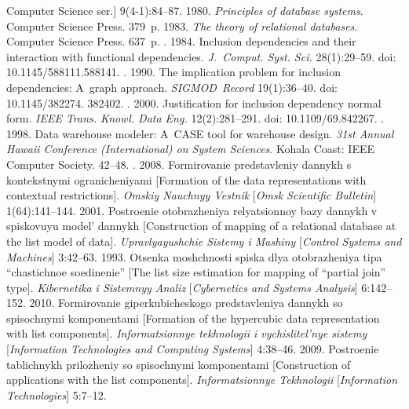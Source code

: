 \begin{multicols}{2}
{{\begin{thebibliography}{99}
{Computer Science ser.}] 9(4-1):84--87.
 1980. \textit{Principles of database systems}. Computer Science Press. 379~p.
 1983. \textit{The theory of relational databases}. Computer Science Press. 637~p.
. 1984. 
Inclusion dependencies and their interaction with functional dependencies. 
\textit{J.~Comput. Syst. Sci.} 28(1):29--59. doi: 10.1145/588111.588141.
. 1990. 
The implication problem for inclusion dependencies: A~graph approach. 
\mbox{\textit{SIGMOD Record}} 19(1):36--40. doi: 10.1145/382274. 382402.
. 2000. 
Justification for inclusion dependency normal form. 
\textit{IEEE Trans. Knowl. Data Eng.} 12(2):281--291. 
doi: 10.1109/69.842267.
. 1998. Data warehouse modeler: 
A~CASE tool for warehouse design. 
\textit{31st Annual Hawaii  Conference (International) on System Sciences}. Kohala Coast:
IEEE Computer Society. 42--48.
. 2008. 
Formirovanie predstavleniy dannykh s kontekstnymi ogranicheniyami 
[Formation of the data representations with contextual restrictions]. 
\textit{Omskiy Nauchnyy Vestnik} [\textit{Omsk Scientific Bulletin}] 1(64):141--144.
 2001. Postroenie otobrazheniya relyatsionnoy bazy dannykh 
v spiskovuyu model' dannykh [Construction of mapping of a relational database 
at the list model of data]. \textit{Upravlyayushchie Sistemy i Mashiny} 
[\textit{Control Systems and Machines}] 3:42--63.
 1993. Otsenka moshchnosti spiska dlya otob\-ra\-zhe\-niya tipa 
``chastichnoe soedinenie'' 
[The list size estimation for mapping of ``partial join'' type]. 
\textit{Kibernetika i Sistemnyy Analiz} [\textit{Cybernetics and Systems Analysis}] 6:142--152.
 2010. Formirovanie giperkubicheskogo predstavleniya dannykh 
so spisochnymi komponentami [Formation of the hypercubic data representation with 
list components]. 
\textit{Informatsionnye tekhnologii i vychislitel'nye sistemy} 
[\textit{Information Technologies and Computing Systems}] 4:38--46.
 2009. Postroenie tablichnykh prilozheniy so spisochnymi komponentami 
[Construction of applications with the list components]. 
\textit{Informatsionnye Tekhnologii} [\textit{Information Technologies}] 5:7--12.

\end{thebibliography}
} }


\end{multicols}

